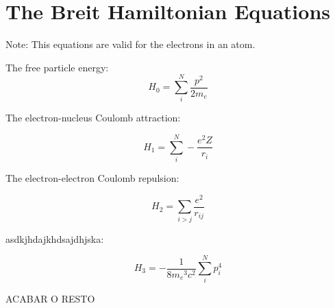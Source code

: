 

\chapter{The Breit Hamiltonian Equations}\label{ap:Breit}

Note: This equations are valid for the electrons in an atom.


The free particle energy:
\begin{equation}
    \displaystyle H_0=\sum_i^N \frac{p^2}{2m_e}
\end{equation}

The electron-nucleus Coulomb attraction:

\begin{equation}
    \displaystyle H_1 = \sum_i^N -\frac{e^2 Z}{r_i}
\end{equation}

The electron-electron Coulomb repulsion:

\begin{equation}
    H_2 = \displaystyle \sum_{i>j}\frac{e^2}{r_{ij}}
\end{equation}

asdkjhdajkhdsajdhjska:

\begin{equation}
    H_3 = -\frac{1}{8 {m_e}^3 c^2}\sum_{i}^{N} p_i^4
\end{equation}


ACABAR O RESTO